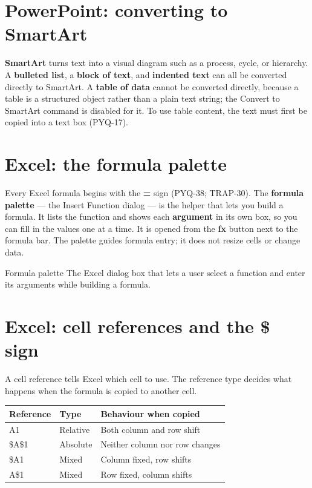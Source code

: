 \section{PowerPoint: converting to SmartArt}
\textbf{SmartArt} turns text into a visual diagram such as a process, cycle,
or hierarchy. A \textbf{bulleted list}, a \textbf{block of text}, and
\textbf{indented text} can all be converted directly to SmartArt. A
\textbf{table of data} cannot be converted directly, because a table is a
structured object rather than a plain text string; the Convert to SmartArt
command is disabled for it. To use table content, the text must first be
copied into a text box (PYQ-17).

\section{Excel: the formula palette}
Every Excel formula begins with the \textbf{=} sign (PYQ-38; TRAP-30). The
\textbf{formula palette} --- the Insert Function dialog --- is the helper that
lets you build a formula. It lists the function and shows each
\textbf{argument} in its own box, so you can fill in the values one at a
time. It is opened from the \textbf{fx} button next to the formula bar. The
palette guides formula entry; it does not resize cells or change data.

\begin{definitionbox}{Formula palette}
The Excel dialog box that lets a user select a function and enter its
arguments while building a formula.
\end{definitionbox}

\section{Excel: cell references and the \$ sign}
A cell reference tells Excel which cell to use. The reference type decides
what happens when the formula is copied to another cell.

\begin{center}
\begin{tabular}{p{}p{}p{}}
\toprule
\textbf{Reference} & \textbf{Type} & \textbf{Behaviour when copied} \\
\midrule
A1 & Relative & Both column and row shift \\
\$A\$1 & Absolute & Neither column nor row changes \\
\$A1 & Mixed & Column fixed, row shifts \\
A\$1 & Mixed & Row fixed, column shifts \\
\bottomrule
\end{tabular}
\end{center}

